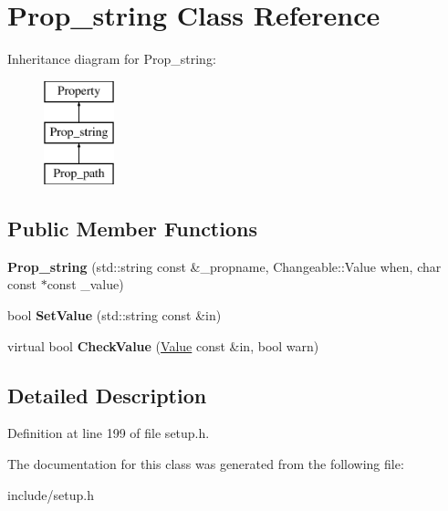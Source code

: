 \hypertarget{classProp__string}{\section{Prop\-\_\-string Class Reference}
\label{classProp__string}
}
Inheritance diagram for Prop\-\_\-string\-:\begin{figure}[H]
\begin{center}
\leavevmode
\includegraphics[height=3.000000cm]{classProp__string}
\end{center}
\end{figure}
\subsection*{Public Member Functions}
\begin{DoxyCompactItemize}
\item 
\hypertarget{classProp__string_ad7cfeff160dad431615b378934fd409f}{{\bfseries Prop\-\_\-string} (std\-::string const \&\-\_\-propname, Changeable\-::\-Value when, char const $\ast$const \-\_\-value)}\label{classProp__string_ad7cfeff160dad431615b378934fd409f}

\item 
\hypertarget{classProp__string_aa0bdbb5d31c417f314d8a4b2b3453ded}{bool {\bfseries Set\-Value} (std\-::string const \&in)}\label{classProp__string_aa0bdbb5d31c417f314d8a4b2b3453ded}

\item 
\hypertarget{classProp__string_a26ed01f23402cdc735601654fdaa39b6}{virtual bool {\bfseries Check\-Value} (\hyperlink{classValue}{Value} const \&in, bool warn)}\label{classProp__string_a26ed01f23402cdc735601654fdaa39b6}

\end{DoxyCompactItemize}


\subsection{Detailed Description}


Definition at line 199 of file setup.\-h.



The documentation for this class was generated from the following file\-:\begin{DoxyCompactItemize}
\item 
include/setup.\-h\end{DoxyCompactItemize}
